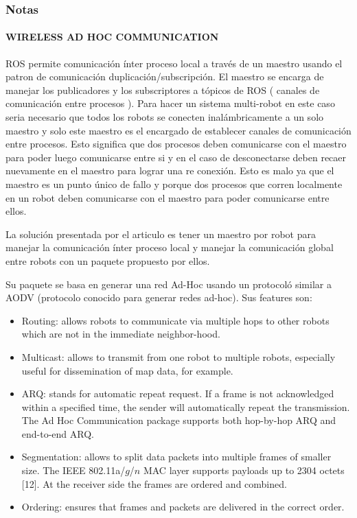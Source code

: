 \subsubsection{Notas}
\paragraph{WIRELESS AD HOC COMMUNICATION}

ROS permite comunicación ínter proceso local a través de un maestro usando el patron de comunicación duplicación/subscripción. El maestro se encarga de manejar los publicadores y los subscriptores a  tópicos de ROS ( canales de comunicación entre procesos ). Para hacer un sistema multi-robot en este caso seria necesario que todos los robots se conecten inalámbricamente a un solo maestro y solo este maestro es el encargado de establecer canales de comunicación entre procesos. Esto significa que dos procesos deben comunicarse con el maestro para poder luego comunicarse entre si y en el caso de desconectarse deben recaer nuevamente en el maestro para lograr una re conexión. Esto es malo ya que el maestro es un punto único de fallo y porque dos procesos que corren localmente en un robot deben comunicarse con el maestro para poder comunicarse entre ellos.

La solución presentada por el articulo es tener un maestro por robot para manejar la comunicación ínter proceso local y manejar la comunicación global entre robots con un paquete propuesto por ellos. 

Su paquete se basa en generar una red Ad-Hoc usando un protocoló similar a AODV (protocolo conocido para generar redes ad-hoc). Sus features son:
\begin{itemize}
\item Routing: allows robots to communicate via multiple hops to other robots which are not in the immediate neighbor-hood.
\item Multicast: allows to transmit from one robot to multiple robots, especially useful for dissemination of map data, for example.
\item ARQ: stands for automatic repeat request. If a frame is not acknowledged within a specified time, the sender will automatically repeat the transmission. The Ad Hoc Communication package supports both hop-by-hop ARQ and end-to-end ARQ.
\item Segmentation: allows to split data packets into multiple frames of smaller size. The IEEE 802.11a/$g$/$n$ MAC layer supports payloads up to 2304 octets [12]. At the receiver side the frames are ordered and combined.
\item Ordering: ensures that frames and packets are delivered in the correct order.
\end{itemize}

